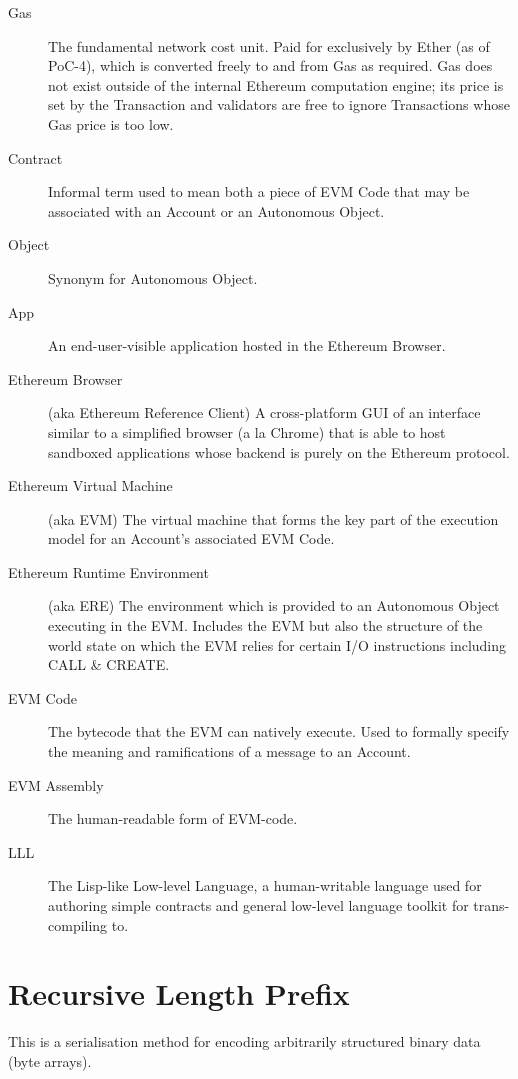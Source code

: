 \documentclass[9pt,oneside]{amsart}
\begin{document}
\begin{description}
\item[Gas] The fundamental network cost unit. Paid for exclusively by Ether (as of PoC-4), which is converted freely to and from Gas as required. Gas does not exist outside of the internal Ethereum computation engine; its price is set by the Transaction and validators are free to ignore Transactions whose Gas price is too low.

\item[Contract] Informal term used to mean both a piece of EVM Code that may be associated with an Account or an Autonomous Object.

\item[Object] Synonym for Autonomous Object.

\item[App] An end-user-visible application hosted in the Ethereum Browser.

\item[Ethereum Browser] (aka Ethereum Reference Client) A cross-platform GUI of an interface similar to a simplified browser (a la Chrome) that is able to host sandboxed applications whose backend is purely on the Ethereum protocol.

\item[Ethereum Virtual Machine] (aka EVM) The virtual machine that forms the key part of the execution model for an Account's associated EVM Code.

\item[Ethereum Runtime Environment] (aka ERE) The environment which is provided to an Autonomous Object executing in the EVM. Includes the EVM but also the structure of the world state on which the EVM relies for certain I/O instructions including CALL \& CREATE.

\item[EVM Code] The bytecode that the EVM can natively execute. Used to formally specify the meaning and ramifications of a message to an Account.

\item[EVM Assembly] The human-readable form of EVM-code.

\item[LLL] The Lisp-like Low-level Language, a human-writable language used for authoring simple contracts and general low-level language toolkit for trans-compiling to.

\end{description}

\section{Recursive Length Prefix}\label{app:rlp}\hypertarget{rlp}{}
This is a serialisation method for encoding arbitrarily structured binary data (byte arrays).
\end{document}
